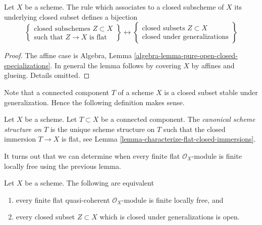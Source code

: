 \begin{lemma}
\label{lemma-characterize-flat-closed-immersions}
Let $X$ be a scheme. The rule which associates to a closed subscheme
of $X$ its underlying closed subset defines a bijection
$$
\left\{
\begin{matrix}
\text{closed subschemes }Z \subset X \\
\text{such that }Z \to X\text{ is flat}
\end{matrix}
\right\}
\leftrightarrow
\left\{
\begin{matrix}
\text{closed subsets }Z \subset X \\
\text{closed under generalizations}
\end{matrix}
\right\}
$$
\end{lemma}

\begin{proof}
The affine case is
Algebra, Lemma \ref{algebra-lemma-pure-open-closed-specializations}.
In general the lemma follows by covering $X$ by affines and glueing.
Details omitted.
\end{proof}

\noindent
Note that a connected component $T$ of a scheme $X$ is a closed
subset stable under generalization. Hence the following definition
makes sense.

\begin{definition}
\label{definition-scheme-structure-connected-component}
Let $X$ be a scheme. Let $T \subset X$ be a connected component.
The {\it canonical scheme structure on $T$} is the unique
scheme structure on $T$ such that the closed immersion $T \to X$
is flat, see
Lemma \ref{lemma-characterize-flat-closed-immersions}.
\end{definition}

\noindent
It turns out that we can determine when every finite flat
$\mathcal{O}_X$-module is finite locally free using the previous lemma.

\begin{lemma}
\label{lemma-finite-flat-is-finite-locally-free}
Let $X$ be a scheme. The following are equivalent
\begin{enumerate}
\item every finite flat quasi-coherent $\mathcal{O}_X$-module is
finite locally free, and
\item every closed subset $Z \subset X$ which is closed under generalizations
is open.
\end{enumerate}
\end{lemma}

